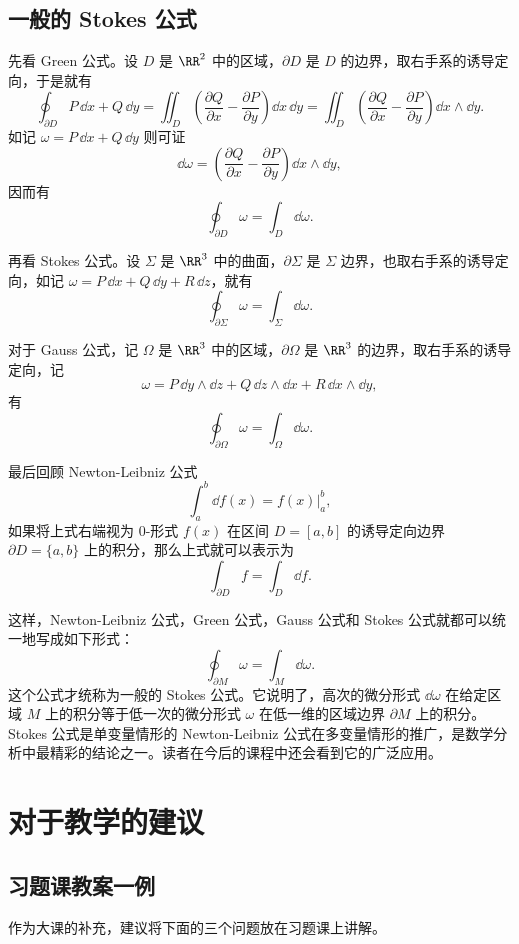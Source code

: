 \subsection{一般的 Stokes 公式}

先看 Green 公式。设 $D$ 是 $\RR^2$ 中的区域，$\partial D$ 是 $D$ 的边界，取右手系的诱导定向，于是就有
\[
  \oint_{\partial D}P\,\dd x+Q\,\dd y
  =\iint_D\left(\frac{\partial Q}{\partial x}-\frac{\partial P}{\partial y}\right)\dd x\,\dd y
  =\iint_D\left(\frac{\partial Q}{\partial x}-\frac{\partial P}{\partial y}\right)\dd x\wedge\dd y.
\]
如记 $\omega=P\,\dd x+Q\,\dd y$ 则可证
\[
  \dd\omega=\left(\frac{\partial Q}{\partial x}-\frac{\partial P}{\partial y}\right)\dd x\wedge\dd y,
\]
因而有
\[
  \oint_{\partial D}\omega=\int_D\dd\omega.
\]

再看 Stokes 公式。设 $\Sigma$ 是 $\RR^3$ 中的曲面，$\partial\Sigma$ 是 $\Sigma$ 边界，也取右手系的诱导定向，如记 $\omega=P\,\dd x+Q\,\dd y+R\,\dd z$，就有
\[
  \oint_{\partial\Sigma}\omega=\int_\Sigma\dd\omega.
\]

对于 Gauss 公式，记 $\Omega$ 是 $\RR^3$ 中的区域，$\partial\Omega$ 是 $\RR^3$ 的边界，取右手系的诱导定向，记
\[
  \omega=P\,\dd y\wedge\dd z+Q\,\dd z\wedge\dd x+R\,\dd x\wedge\dd y,
\]
有
\[
  \oint_{\partial\Omega}\omega=\int_\Omega\dd\omega.
\]

最后回顾 Newton-Leibniz 公式
\[
  \int_a^b\dd f(x)=f(x)\big|_a^b,
\]
如果将上式右端视为 0-形式 $f(x)$ 在区间 $D=[a,b]$ 的诱导定向边界 $\partial D=\{a,b\}$ 上的积分，那么上式就可以表示为
\[
  \int_{\partial D}f=\int_D\dd f.
\]

这样，Newton-Leibniz 公式，Green 公式，Gauss 公式和 Stokes 公式就都可以统一地写成如下形式：
\[
  \oint_{\partial M}\omega=\int_M\dd\omega.
\]
这个公式才统称为一般的 Stokes 公式。它说明了，高次的微分形式 $\dd\omega$ 在给定区域 $M$ 上的积分等于低一次的微分形式 $\omega$ 在低一维的区域边界 $\partial M$ 上的积分。Stokes 公式是单变量情形的 Newton-Leibniz 公式在多变量情形的推广，是数学分析中最精彩的结论之一。读者在今后的课程中还会看到它的广泛应用。

\section{对于教学的建议}

\subsection{习题课教案一例}

作为大课的补充，建议将下面的三个问题放在习题课上讲解。

